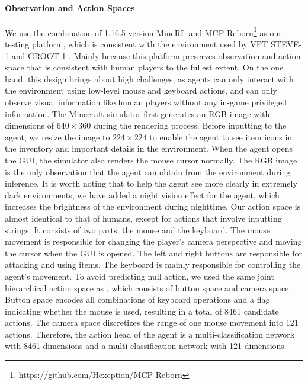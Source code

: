 \paragraph{Observation and Action Spaces} We use the combination of 1.16.5 version MineRL \citep{minerl} and MCP-Reborn\footnote{https://github.com/Hexeption/MCP-Reborn} as our 
testing platform, which is consistent with the environment used by VPT \citep{vpt}
STEVE-1 \citep{steve1} and GROOT-1 \citep{groot1}. Mainly because this platform preserves observation and action space that is consistent with human players to the fullest extent. On the one hand, this design brings about high challenges, as agents can only interact with the environment using low-level mouse and keyboard actions, and can only observe visual information like human players without any in-game privileged information. The Minecraft simulator first generates an RGB image with dimensions of $640 \times 360$ during the rendering process. Before inputting to the agent, we resize the image to $224 \times 224$ to enable the agent to see item icons in the inventory and important details in the environment. When the agent opens the GUI, the simulator also renders the mouse cursor normally. The RGB image is the only observation that the agent can obtain from the environment during inference. It is worth noting that to help the agent see more clearly in extremely dark environments, we have added a night vision effect for the agent, which increases the brightness of the environment during nighttime. Our action space is almost identical to that of humans, except for actions that involve inputting strings. It consists of two parts: the mouse and the keyboard. The mouse movement is responsible for changing the player’s camera perspective and moving the cursor when the GUI is opened. The left and right buttons are responsible for attacking and using items. The keyboard is mainly responsible for controlling the agent’s movement. To avoid predicting null action, we used the same joint hierarchical action space as \cite{vpt}, which consists of button space and camera space. Button space encodes all combinations of keyboard operations and a flag indicating whether the mouse is used, resulting in a total of 8461 candidate actions. The camera space discretizes the range of one mouse movement into 121 actions. Therefore, the action head of the agent is a multi-classification network with 8461 dimensions and a multi-classification network with 121 dimensions. 

